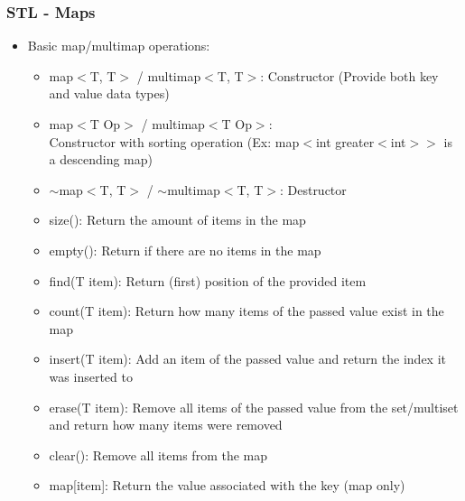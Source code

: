 \begin{frame}\frametitle{STL - Maps}
\begin{itemize}
\item Basic map/multimap operations:
	\begin{itemize}
	\item map$<$T, T$>$ / multimap$<$T, T$>$: Constructor (Provide both key and value data types)
	\item map$<$T Op$>$ / multimap$<$T Op$>$:\\Constructor with sorting operation (Ex: map$<$int greater$<$int$>>$ is a descending map)
	\item $\sim$map$<$T, T$>$ / $\sim$multimap$<$T, T$>$: Destructor
	\item size(): Return the amount of items in the map
	\item empty(): Return if there are no items in the map
	\item find(T item): Return (first) position of the provided item
	\item count(T item): Return how many items of the passed value exist in the map
	\item insert(T item): Add an item of the passed value and return the index it was inserted to
	\item erase(T item): Remove all items of the passed value from the set/multiset and return how many items were removed
	\item clear(): Remove all items from the map
	\item map[item]: Return the value associated with the key (map only)
	\end{itemize}
\end{itemize}
\end{frame}
